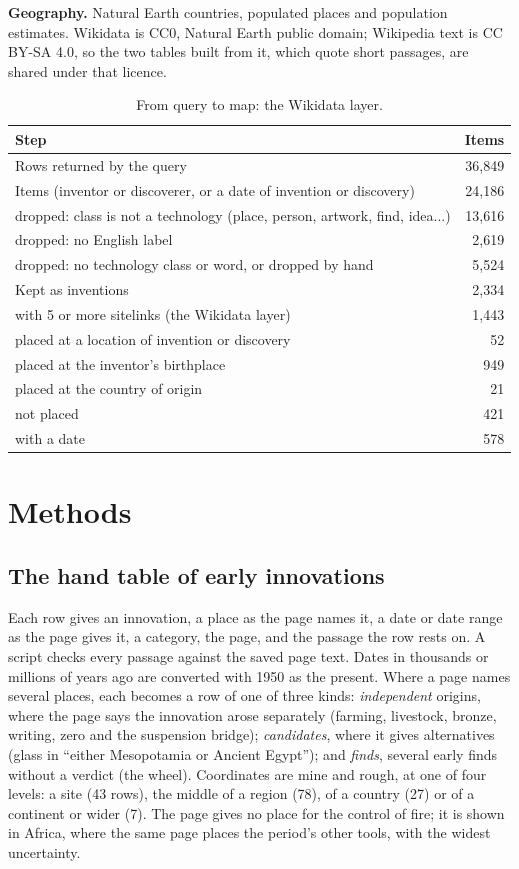\documentclass[11pt,a4paper]{article}
\begin{document}
\textbf{Geography.} Natural Earth \citep{naturalearth} countries, populated places and population estimates. Wikidata is CC0, Natural Earth public domain; Wikipedia text is CC BY-SA 4.0, so the two tables built from it, which quote short passages, are shared under that licence.

\begin{table}[tbp]\centering\small\caption{From query to map: the Wikidata layer.}\label{tab:pipe}\begin{tabular}{p{10.5cm}r}\toprule Step & Items\\\midrule
Rows returned by the query & 36,849\\
Items (inventor or discoverer, or a date of invention or discovery) & 24,186\\
\quad dropped: class is not a technology (place, person, artwork, find, idea...) & 13,616\\
\quad dropped: no English label & 2,619\\
\quad dropped: no technology class or word, or dropped by hand & 5,524\\
Kept as inventions & 2,334\\
\quad with 5 or more sitelinks (the Wikidata layer) & 1,443\\
\quad\quad placed at a location of invention or discovery & 52\\
\quad\quad placed at the inventor's birthplace & 949\\
\quad\quad placed at the country of origin & 21\\
\quad\quad not placed & 421\\
\quad\quad with a date & 578\\
\bottomrule\end{tabular}\end{table}

\section{Methods}
\subsection{The hand table of early innovations}
Each row gives an innovation, a place as the page names it, a date or date range as the page gives it, a category, the page, and the passage the row rests on. A script checks every passage against the saved page text. Dates in thousands or millions of years ago are converted with 1950 as the present. Where a page names several places, each becomes a row of one of three kinds: \emph{independent} origins, where the page says the innovation arose separately (farming, livestock, bronze, writing, zero and the suspension bridge); \emph{candidates}, where it gives alternatives (glass in ``either Mesopotamia or Ancient Egypt''); and \emph{finds}, several early finds without a verdict (the wheel). Coordinates are mine and rough, at one of four levels: a site (43 rows), the middle of a region (78), of a country (27) or of a continent or wider (7). The page gives no place for the control of fire; it is shown in Africa, where the same page places the period's other tools, with the widest uncertainty.
\end{document}
